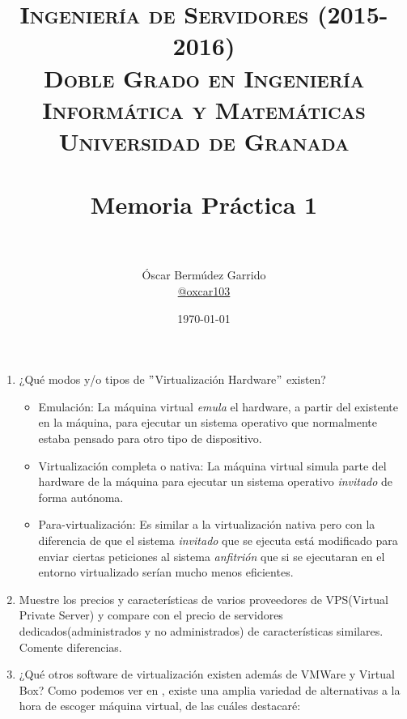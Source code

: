\documentclass[paper=a4, fontsize=11pt]{scrartcl} %
\title{	
\normalfont \normalsize 
\textsc{{\bf Ingeniería de Servidores (2015-2016)} \\ Doble Grado en Ingeniería Informática y Matemáticas \\ Universidad de Granada} \\ [25pt] %
\horrule{0.5pt} \\[0.4cm] %
\huge Memoria Práctica 1 \\ %
\horrule{2pt} \\[0.5cm] %
}
\author{Óscar Bermúdez Garrido\\ \href{http://www.github.com/oxcar103}{@oxcar103}} %
\date{\normalsize\today} %
\numberwithin{equation}{section} %
\numberwithin{figure}{section} %
\numberwithin{table}{section} %
\begin{document}
\maketitle %

\newpage %

\tableofcontents %

\listoffigures

\listoftables

\newpage


\begin{enumerate}
	\section{Introducción}
	\subsection{Concepto de Máquina Virtual y virtualización}
		\item ¿Qué modos y/o tipos de $"$Virtualización Hardware$"$ existen?
		\begin{itemize}
			\item Emulación: La máquina virtual \textit{emula} el hardware, a partir del existente
			en la máquina, para ejecutar un sistema operativo que normalmente estaba pensado para
			otro tipo de dispositivo.
			
			\item Virtualización completa o nativa: La máquina virtual simula parte del hardware de
			la máquina para ejecutar un sistema operativo \textit{invitado} de forma autónoma.
			
			\item Para-virtualización: Es similar a la virtualización nativa pero con la diferencia
			de que el sistema \textit{invitado} que se ejecuta está modificado para enviar ciertas
			peticiones al sistema \textit{anfitrión} que si se ejecutaran en el entorno virtualizado
			serían mucho menos eficientes.
		\end{itemize}
		\cite{Virt}
		
		\item Muestre los precios y características de varios proveedores de VPS(Virtual Private
		Server) y compare con el precio de servidores dedicados(administrados y no administrados)
		de características similares. Comente diferencias.
		
		\item ¿Qué otros software de virtualización existen además de VMWare y Virtual Box?
		Como podemos ver en \cite{VMSW}, existe una amplia variedad de alternativas a la hora de
		escoger máquina virtual, de las cuáles destacaré:
		

\end{enumerate}
\end{document}
